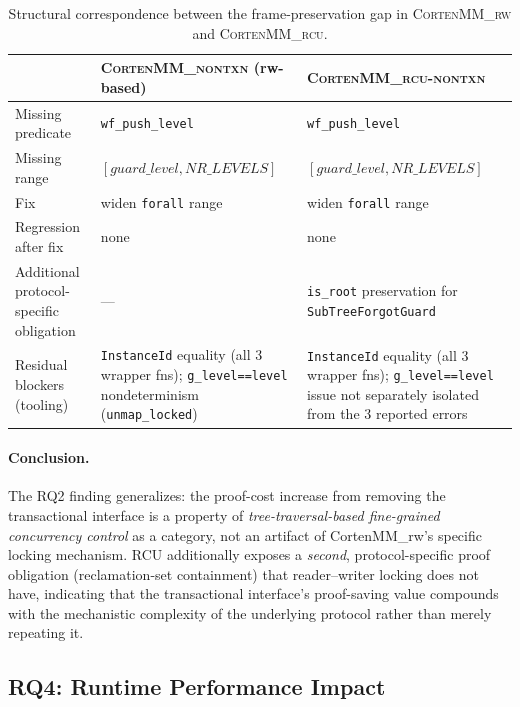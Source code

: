 \documentclass[10pt]{article}
\newcommand{\corten}[1]{\textsc{CortenMM\_#1}}
\newcommand{\vfn}[1]{\texttt{#1}}
\begin{document}
\begin{table}[h]
\centering
\caption{Structural correspondence between the frame-preservation gap in
\corten{rw} and \corten{rcu}.}
\label{tab:rcu-correspondence}
\begin{tabularx}{\textwidth}{@{}>{\raggedright\arraybackslash}p{3.6cm} >{\raggedright\arraybackslash}X >{\raggedright\arraybackslash}X@{}}
\toprule
 & \corten{nontxn} (rw-based) & \corten{rcu-nontxn} \\
\midrule
Missing predicate & \texttt{wf\_push\_level} & \texttt{wf\_push\_level} \\
Missing range & $[\mathit{guard\_level}, \mathit{NR\_LEVELS}]$ & $[\mathit{guard\_level}, \mathit{NR\_LEVELS}]$ \\
Fix & widen \texttt{forall} range & widen \texttt{forall} range \\
Regression after fix & none & none \\
Additional protocol-specific obligation & --- & \texttt{is\_root} preservation for \texttt{SubTreeForgotGuard} \\
Residual blockers (tooling) & \texttt{InstanceId} equality (all 3 wrapper fns); \texttt{g\_level==level} nondeterminism (\vfn{unmap\_locked}) & \texttt{InstanceId} equality (all 3 wrapper fns); \vfn{g\_level==level} issue not separately isolated from the 3 reported errors \\
\bottomrule
\end{tabularx}
\end{table}

\paragraph{Conclusion.} The RQ2 finding generalizes: the proof-cost
increase from removing the transactional interface is a property of
\emph{tree-traversal-based fine-grained concurrency control} as a
category, not an artifact of CortenMM\_rw's specific locking mechanism.
RCU additionally exposes a \emph{second}, protocol-specific proof
obligation (reclamation-set containment) that reader--writer locking does
not have, indicating that the transactional interface's proof-saving
value compounds with the mechanistic complexity of the underlying
protocol rather than merely repeating it.

\subsection{RQ4: Runtime Performance Impact}
\label{sec:eval:perf}
\end{document}
